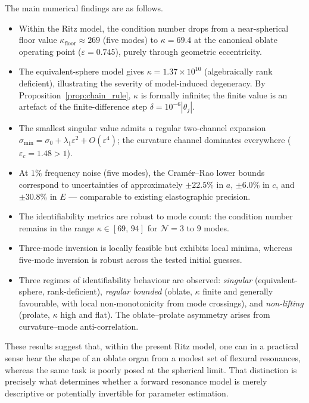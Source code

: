 The main numerical findings are as follows.
\begin{itemize}
  \item Within the Ritz model, the condition number drops from a near-spherical
  floor value $\kappa_\mathrm{floor}\approx269$ (five modes) to
  $\kappa = 69.4$ at the canonical oblate operating point
  ($\varepsilon=0.745$), purely through geometric eccentricity.
  \item The equivalent-sphere model gives
  $\kappa = 1.37 \times 10^{10}$ (algebraically rank deficient), illustrating
  the severity of model-induced degeneracy.  By
  Proposition~\ref{prop:chain_rule}, $\kappa$ is formally infinite; the finite
  value is an artefact of the finite-difference step $\delta = 10^{-6}|\theta_j|$.
  \item The smallest singular value admits a regular two-channel expansion
  $\sigma_{\min} = \sigma_0 + \lambda_1\varepsilon^2 + O(\varepsilon^4)$;
  the curvature channel dominates everywhere ($\varepsilon_c = 1.48 > 1$).
  \item At $1\%$ frequency noise (five modes), the Cram\'er--Rao lower bounds
  correspond to uncertainties of approximately $\pm 22.5\%$ in $a$, $\pm 6.0\%$
  in $c$, and $\pm 30.8\%$ in $E$ --- comparable to existing elastographic
  precision.
  \item The identifiability metrics are robust to mode count: the condition
  number remains in the range $\kappa\in[69,\,94]$ for $\mathcal{N}=3$
  to $9$ modes.
  \item Three-mode inversion is locally feasible but exhibits local minima,
  whereas five-mode inversion is robust across the tested initial guesses.
  \item Three regimes of identifiability behaviour are observed:
  \emph{singular} (equivalent-sphere,
  rank-deficient), \emph{regular bounded} (oblate, $\kappa$ finite and
  generally favourable, with local non-monotonicity from mode crossings), and
  \emph{non-lifting} (prolate, $\kappa$ high and flat).
  The oblate--prolate asymmetry arises from curvature--mode anti-correlation.
\end{itemize}

These results suggest that, within the present Ritz model, one can in a
practical sense hear the shape of an
oblate organ from a modest set of flexural resonances, whereas the same task is
poorly posed at the spherical limit.  That distinction is precisely what
determines whether a forward resonance model is merely descriptive or
potentially invertible for parameter estimation.

